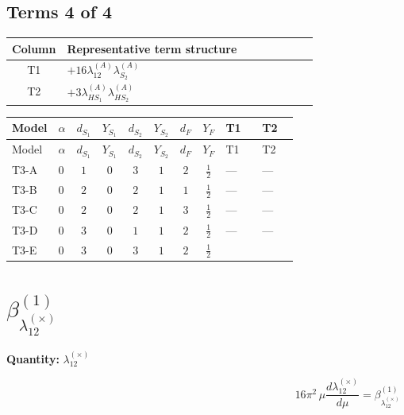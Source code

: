 \documentclass[8pt]{article}
\begin{document}
\begin{landscape}
\subsection*{Terms 4 of 4}
\begin{center}
\begin{tabular}{@{}c >{\raggedright\arraybackslash}p{0.82\linewidth}@{}}
\toprule
Column & Representative term structure \\
\midrule
T1 & \(\displaystyle +16 {\lambda_{12}^{(A)}} {\lambda_{S_2}^{(A)}}\) \\
\midrule
T2 & \(\displaystyle +3 {\lambda_{HS_1}^{(A)}} {\lambda_{HS_2}^{(A)}}\) \\
\midrule
\bottomrule
\end{tabular}
\end{center}
\smallskip
\tiny
\begin{longtable}{@{}llcccccc >{\raggedright\arraybackslash}p{0.21\linewidth} >{\raggedright\arraybackslash}p{0.21\linewidth}@{}}
\toprule
Model & $\alpha$ & $d_{S_1}$ & $Y_{S_1}$ & $d_{S_2}$ & $Y_{S_2}$ & $d_F$ & $Y_F$ & T1 & T2 \\
\midrule
\endfirsthead
\toprule
Model & $\alpha$ & $d_{S_1}$ & $Y_{S_1}$ & $d_{S_2}$ & $Y_{S_2}$ & $d_F$ & $Y_F$ & T1 & T2 \\
\midrule
\endhead
T3-A & $0$ & $1$ & $0$ & $3$ & $1$ & $2$ & $\frac{1}{2}$ & --- & --- \\
\midrule
T3-B & $0$ & $2$ & $0$ & $2$ & $1$ & $1$ & $\frac{1}{2}$ & --- & --- \\
\midrule
T3-C & $0$ & $2$ & $0$ & $2$ & $1$ & $3$ & $\frac{1}{2}$ & --- & --- \\
\midrule
T3-D & $0$ & $3$ & $0$ & $1$ & $1$ & $2$ & $\frac{1}{2}$ & --- & --- \\
\midrule
T3-E & $0$ & $3$ & $0$ & $3$ & $1$ & $2$ & $\frac{1}{2}$ & \scriptsize\adjustbox{max width=\linewidth}{$\begin{gathered} +16 {\lambda_{12}^{(A)}} {\lambda_{S_2}^{(A)}}\end{gathered}$} & \scriptsize\adjustbox{max width=\linewidth}{$\begin{gathered} +3 {\lambda_{HS_1}^{(A)}} {\lambda_{HS_2}^{(A)}}\end{gathered}$} \\
\midrule
\bottomrule
\end{longtable}
\clearpage
\section*{$\beta_{\lambda_{12}^{(\times)}}^{(1)}$}
\noindent\textbf{Quantity: }$\lambda_{12}^{(\times)}$\par\smallskip
\[16\pi^2\,\mu\frac{d \lambda_{12}^{(\times)}}{d\mu}=\beta_{\lambda_{12}^{(\times)}}^{(1)}\]

\end{landscape}
\end{document}
